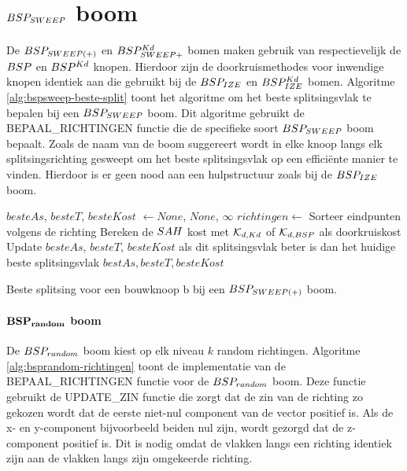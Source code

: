 \section{$BSP_{SWEEP}$ boom}
\label{sec:h4-bspsweep}
De $BSP_{SWEEP(+)}$ en $BSP^{Kd}_{SWEEP+}$ bomen maken gebruik van respectievelijk de $BSP$ en $BSP^{Kd}$ knopen.
Hierdoor zijn de doorkruismethodes voor inwendige knopen identiek aan die gebruikt bij de $BSP_{IZE}$ en $BSP^{Kd}_{IZE}$ bomen.
Algoritme \ref{alg:bspsweep-beste-split} toont het algoritme om het beste splitsingsvlak te bepalen bij een $BSP_{SWEEP}$ boom.
Dit algoritme gebruikt de BEPAAL\_RICHTINGEN functie die de specifieke soort $BSP_{SWEEP}$ boom bepaalt.
Zoals de naam van de boom suggereert wordt in elke knoop langs elk splitsingsrichting gesweept om het beste splitsingsvlak op een efficiënte manier te vinden.
Hierdoor is er geen nood aan een hulpstructuur zoals bij de $BSP_{IZE}$ boom.

\begin{dutchalgorithm}
    \begin{algorithmic}       
            \State $besteAs$, $besteT$, $besteKost$ $\gets None$, $None$, $\infty$
            \State $richtingen \gets $ 
                \State Sorteer eindpunten volgens de richting
                    \State Bereken de $SAH$ kost met $\mathcal{K}_{d,Kd}$ of $\mathcal{K}_{d,BSP}$ als doorkruiskost
                    \State Update $besteAs$, $besteT$, $besteKost$ als dit splitsingsvlak beter is dan het huidige beste splitsingsvlak
                \EndFor     
            \EndFor
            \State \Return $bestAs, besteT, besteKost$
        \EndFunction
    \end{algorithmic}
    \caption{Beste splitsing voor een bouwknoop b bij een $BSP_{SWEEP(+)}$  boom.}
    \label{alg:bspsweep-beste-split}
\end{dutchalgorithm}

\paragraph{$\mathbf{BSP_{random}}$ boom}
De $BSP_{random}$ boom kiest op elk niveau $k$ random richtingen.
Algoritme \ref{alg:bsprandom-richtingen} toont de implementatie van de BEPAAL\_RICHTINGEN functie voor de $BSP_{random}$ boom. 
Deze functie gebruikt de UPDATE\_ZIN functie die zorgt dat de zin van de richting zo gekozen wordt dat de eerste niet-nul component van de vector positief is. Als de x- en y-component bijvoorbeeld beiden nul zijn, wordt gezorgd dat de z-component positief is.
Dit is nodig omdat de vlakken langs een richting identiek zijn aan de vlakken langs zijn omgekeerde richting.

